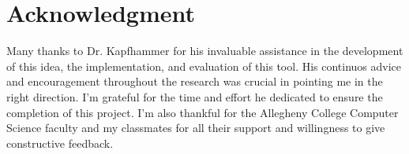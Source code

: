 \chapter*{Acknowledgment}

Many thanks to Dr. Kapfhammer for his invaluable assistance in the development of this
idea, the implementation, and evaluation of this tool. His continuos advice
and encouragement throughout the research was crucial in pointing me in the
right direction. I'm grateful for the time and effort he dedicated to ensure the
completion of this project. I'm also thankful for the Allegheny College
Computer Science faculty and my classmates for all their support and willingness
to give constructive feedback.
